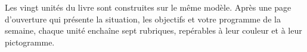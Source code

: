 
Les vingt unités du livre sont construites sur le même modèle. Après une page d'ouverture qui
présente la situation, les objectifs et votre programme de la semaine, chaque unité enchaîne
sept rubriques, repérables à leur couleur et à leur pictogramme.\par\vspace{5mm}

\newcommand{\otEtape}[5]{%
  \noindent\begin{tikzpicture}[baseline=(t.north)]
    \fill[\otRubCoul{#1},rounded corners=2.4mm] (0,-11mm) rectangle (11mm,0);
    \otDessinIcone{\otRubIco{#1}}{white}{\otRubCoul{#1}}{6.6mm}{(5.5mm,-5.5mm)}
    \node[anchor=north west,inner sep=0pt] (t) at (0,0) {};
  \end{tikzpicture}\hspace{4mm}%
  \begin{minipage}[t]{\dimexpr\linewidth-15mm\relax}
    {\otSemi\fontsize{7.2}{9}\selectfont\color{\otRubCoul{#1}}\otCaps[12]{\otRubEN{#1}}}\hspace{2mm}%
    {\otSemi\fontsize{12}{14}\selectfont #2}\hfill{\otRegular\fontsize{8.4}{10}\selectfont\color{otMuted}#4}\par\vspace{1mm}
    {\fontsize{10.2}{13}\selectfont #3\par}
    \if\relax\detokenize{#5}\relax\else\vspace{1mm}{\fontsize{9.4}{12}\selectfont\color{otMuted}#5\par}\fi
  \end{minipage}\par\vspace{5mm}}

